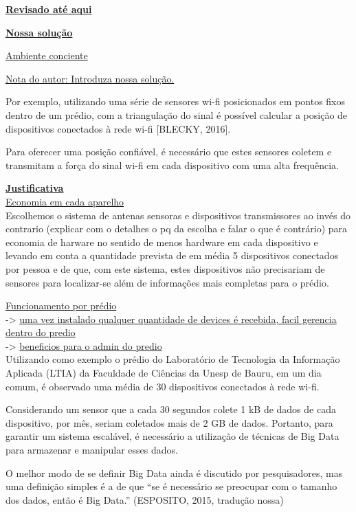 \documentclass[
	12pt,				%
	openright,			%
	oneside,			%
	a4paper,			%
	chapter=TITLE,		%
	english,			%
	french,				%
	spanish,			%
	brazil				%
	]{abntex2}
\begin{document}
{\textbf{\underline{Revisado até aqui}}

\textbf{\underline{Nossa solução}}

\underline{Ambiente conciente}

\underline{Nota do autor: Introduza nossa solução.}



Por exemplo, utilizando uma série de sensores wi-fi posicionados em pontos fixos
dentro de um prédio, com a triangulação do sinal é possível calcular a posição
de dispositivos conectados à rede wi-fi [BLECKY, 2016].



Para oferecer uma posição confiável, é necessário que estes sensores coletem e
transmitam a força do sinal wi-fi em cada dispositivo com uma alta frequência.


\textbf{\underline{Justificativa }}\\


\underline{Economia em cada aparelho}\\

Escolhemos o sistema de antenas sensoras e dispositivos transmissores ao invés
do contrario (explicar com o detalhes o pq da escolha e falar o que é contrário)
para economia de harware no sentido de menos hardware em cada dispositivo e
levando em conta  a quantidade prevista de em média 5 dispositivos conectados
por pessoa e de que, com este sistema, estes dispositivos não precisariam de
sensores para localizar-se além de informações mais completas para o prédio.

\underline{Funcionamento por prédio} \\
 -> \underline{uma vez instalado qualquer quantidade de
devices é recebida, facil gerencia dentro do predio}\\
 -> \underline {beneficios para o admin do predio}\\


Utilizando como exemplo o prédio do Laboratório de Tecnologia da Informação
Aplicada (LTIA) da Faculdade de Ciências da Unesp de Bauru, em um dia comum, é
observado uma média de 30 dispositivos conectados à rede wi-fi.

Considerando um sensor que a cada 30 segundos colete 1 kB de dados de cada
dispositivo, por mês, seriam coletados mais de 2 GB de dados. Portanto, para
garantir um sistema escalável, é necessário a utilização de técnicas de Big Data
para armazenar e manipular esses dados.

O melhor modo de se definir Big Data ainda é discutido por pesquisadores, mas
uma definição simples é a de que “se é necessário se preocupar com o tamanho dos
dados, então é Big Data.” (ESPOSITO, 2015, tradução nossa)


}
\end{document}
